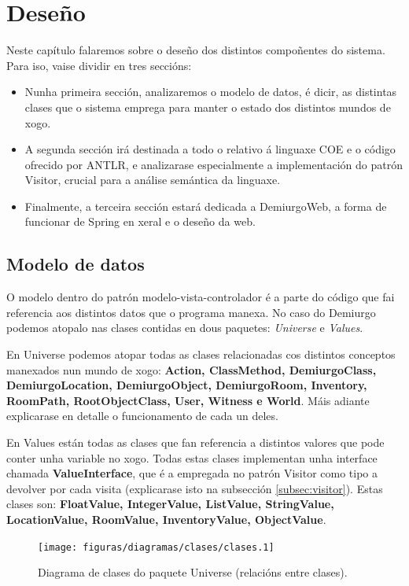 \chapter{Deseño}
\label{ch:desenho}

Neste capítulo falaremos sobre o deseño dos distintos compoñentes do sistema.
Para iso, vaise dividir en tres seccións:
\begin{itemize}
  \item Nunha primeira sección, analizaremos o modelo de datos, é dicir, as
  distintas clases que o sistema emprega para manter o estado dos distintos
  mundos de xogo.
  \item A segunda sección irá destinada a todo o relativo á linguaxe COE e o
  código ofrecido por ANTLR, e analizarase especialmente a implementación do
  patrón Visitor, crucial para a análise semántica da linguaxe.
  \item Finalmente, a terceira sección estará dedicada a DemiurgoWeb, a forma de
  funcionar de Spring en xeral e o deseño da web.
\end{itemize}

\section{Modelo de datos}
O modelo dentro do patrón modelo-vista-controlador é a parte do código
que fai referencia aos distintos datos que o programa manexa. No caso do
Demiurgo podemos atopalo nas clases contidas en dous paquetes: \textit{Universe}
e \textit{Values}.
\par
En Universe podemos atopar todas as clases relacionadas cos distintos conceptos
manexados nun mundo de xogo: \textbf{Action, ClassMethod, DemiurgoClass,
DemiurgoLocation, DemiurgoObject, DemiurgoRoom, Inventory, RoomPath,
RootObjectClass, User, Witness e World}. Máis adiante explicarase en detalle o
funcionamento de cada un deles.
\par
En Values están todas as clases que fan referencia a distintos valores que pode
conter unha variable no xogo. Todas estas clases implementan unha interface
chamada \textbf{ValueInterface}, que é a empregada no patrón Visitor como tipo a
devolver por cada visita (explicarase isto na subsección \ref{subsec:visitor}).
Estas clases son: \textbf{FloatValue, IntegerValue, ListValue, StringValue,
LocationValue, RoomValue, InventoryValue, ObjectValue}.

\begin{figure}
\centerline{\texttt{[image: figuras/diagramas/clases/clases.1]}}
\caption{Diagrama de clases do paquete Universe (relacións entre clases).}
\label{fig:universe}
\end{figure}

